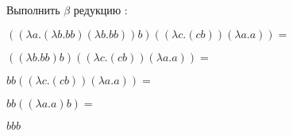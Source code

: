 \documentclass[12pt]{article}
\begin{document}
Выполнить $\beta$ редукцию : \newline 

$ ((\lambda a.(\lambda b.b b) (\lambda b.b b)) b) ((\lambda c.(c b)) (\lambda a.a)) = $ \newline 

$ ((\lambda b.b b) b) ((\lambda c.(c b)) (\lambda a.a)) = $ \newline 

$ b b ((\lambda c.(c b)) (\lambda a.a)) = $ \newline 

$ b b ((\lambda a.a) b) = $ \newline 

$ b b b $ \newline 
\end{document}
